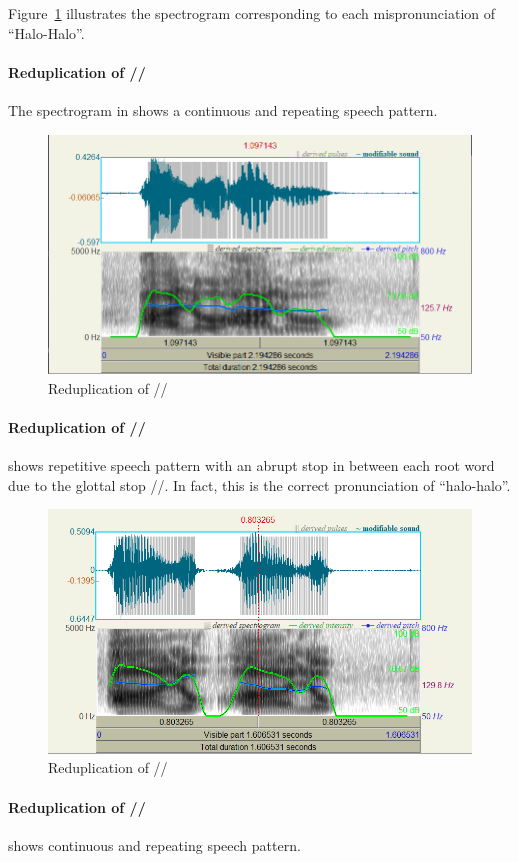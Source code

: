 \documentclass{article}
\begin{document}
Figure~\ref{fig:halo} illustrates the spectrogram corresponding to each
mispronunciation of ``Halo-Halo''.

\paragraph{Reduplication of //} The spectrogram in
 shows a continuous and repeating speech pattern.

\begin{figure}
	\centering
	\includegraphics[width=0.65\linewidth]{img/halo.png}
	\caption{Reduplication of //}\label{fig:halo}
\end{figure}

\paragraph{Reduplication of //}  shows repetitive speech pattern with
an abrupt stop in between each root word due to the glottal stop //. In fact, this is the
correct pronunciation of ``halo-halo''.

\begin{figure}
	\centering
	\includegraphics[width=0.65\linewidth]{img/hal_o.png}
	\caption{Reduplication of //}\label{fig:hal'o}
\end{figure}

\paragraph{Reduplication of //}  shows continuous and repeating
speech pattern.
\end{document}
